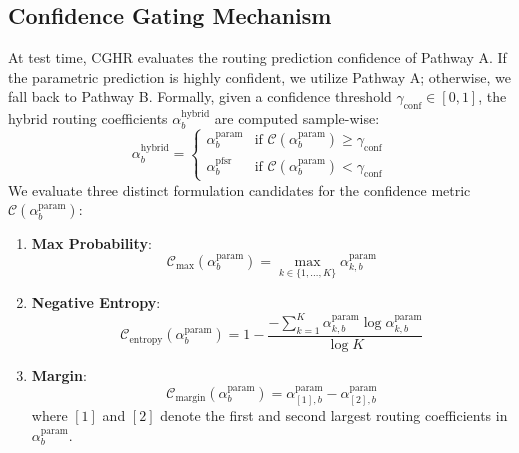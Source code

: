 \subsection{Confidence Gating Mechanism}
At test time, CGHR evaluates the routing prediction confidence of Pathway A. If the parametric prediction is highly confident, we utilize Pathway A; otherwise, we fall back to Pathway B. Formally, given a confidence threshold $\gamma_{\text{conf}} \in [0, 1]$, the hybrid routing coefficients $\alpha^{\text{hybrid}}_b$ are computed sample-wise:
\begin{equation}
\alpha^{\text{hybrid}}_b = \begin{cases} 
\alpha^{\text{param}}_b & \text{if } \mathcal{C}(\alpha^{\text{param}}_b) \ge \gamma_{\text{conf}} \\
\alpha^{\text{pfsr}}_b & \text{if } \mathcal{C}(\alpha^{\text{param}}_b) < \gamma_{\text{conf}}
\end{cases}
\end{equation}
We evaluate three distinct formulation candidates for the confidence metric $\mathcal{C}(\alpha^{\text{param}}_b)$:
\begin{enumerate}
    \item \textbf{Max Probability}:
    \begin{equation}
    \mathcal{C}_{\text{max}}(\alpha^{\text{param}}_b) = \max_{k \in \{1, \dots, K\}} \alpha^{\text{param}}_{k, b}
    \end{equation}
    \item \textbf{Negative Entropy}:
    \begin{equation}
    \mathcal{C}_{\text{entropy}}(\alpha^{\text{param}}_b) = 1 - \frac{-\sum_{k=1}^K \alpha^{\text{param}}_{k, b} \log \alpha^{\text{param}}_{k, b}}{\log K}
    \end{equation}
    \item \textbf{Margin}:
    \begin{equation}
    \mathcal{C}_{\text{margin}}(\alpha^{\text{param}}_b) = \alpha^{\text{param}}_{[1], b} - \alpha^{\text{param}}_{[2], b}
    \end{equation}
    where $[1]$ and $[2]$ denote the first and second largest routing coefficients in $\alpha^{\text{param}}_b$.
\end{enumerate}

